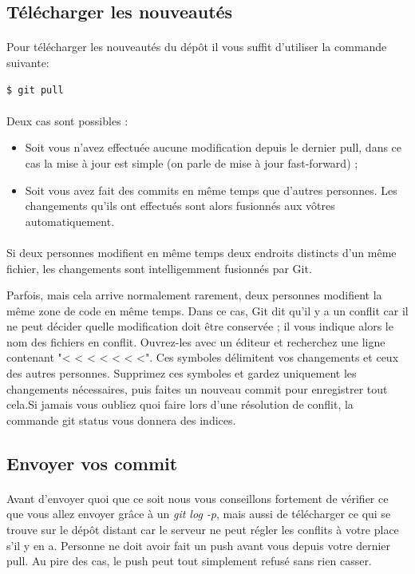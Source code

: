 \documentclass[french, a4paper, 12pt, titlepage]{article}
\begin{document}
\subsection{Télécharger les nouveautés}
\paragraph{}Pour télécharger les nouveautés du dépôt il vous suffit d'utiliser la commande suivante:
\begin{lstlisting}
$ git pull
\end{lstlisting}
\paragraph{}Deux cas sont possibles :
\begin{itemize}
\item Soit vous n’avez effectuée aucune modification depuis le dernier pull, dans ce cas la mise à jour est simple (on parle de mise à jour fast-forward) ;
\item Soit vous avez fait des commits en même temps que d’autres personnes. Les changements qu’ils ont effectués sont alors fusionnés aux vôtres automatiquement.
\end{itemize}

\paragraph{}Si deux personnes modifient en même temps deux endroits distincts d’un même fichier, les changements sont intelligemment fusionnés par Git.

Parfois, mais cela arrive normalement rarement, deux personnes modifient la même zone de code en même temps. Dans ce cas, Git dit qu’il y a un conflit car il ne peut décider quelle modification doit être conservée ; il vous indique alors le nom des fichiers en conflit. Ouvrez-les avec un éditeur et recherchez une ligne contenant "< < < < < < <". Ces symboles délimitent vos changements et ceux des autres personnes. Supprimez ces symboles et gardez uniquement les changements nécessaires, puis faites un nouveau commit pour enregistrer tout cela.Si jamais vous oubliez quoi faire lors d'une résolution de conflit, la commande git status vous donnera des indices.

\subsection{Envoyer vos commit}
\paragraph{}Avant d'envoyer quoi que ce soit nous vous conseillons fortement de vérifier ce que vous allez envoyer grâce à un \emph{git log -p}, mais aussi de télécharger ce qui se trouve sur le dépôt distant car le serveur ne peut régler les conflits à votre place s’il y en a. Personne ne doit avoir fait un push avant vous depuis votre dernier pull. Au pire des cas, le push peut tout simplement refusé sans rien casser.
\end{document}
